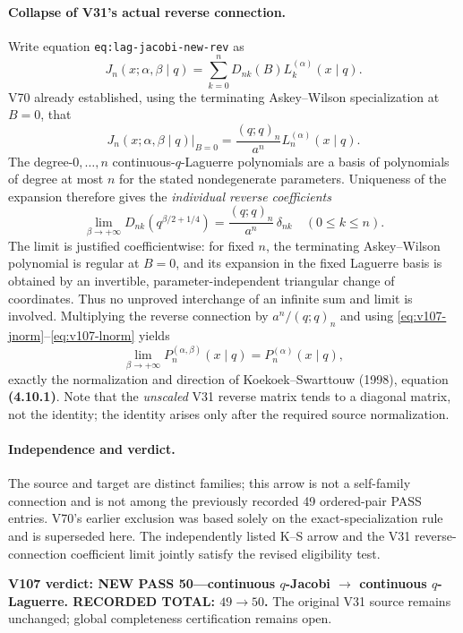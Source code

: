 \documentclass[11pt]{article}
\begin{document}
\paragraph{Collapse of V31's actual reverse connection.}
Write equation \texttt{eq:lag-jacobi-new-rev} as
\[
 J_n(x;\alpha,\beta\mid q)=\sum_{k=0}^n D_{nk}(B) L_k^{(\alpha)}(x\mid q).
\]
V70 already established, using the terminating Askey--Wilson specialization at $B=0$, that
\[
 J_n(x;\alpha,\beta\mid q)\big|_{B=0}=\frac{(q;q)_n}{a^n}L_n^{(\alpha)}(x\mid q).
\]
The degree-$0,\ldots,n$ continuous-$q$-Laguerre polynomials are a basis of polynomials of degree at most $n$ for the stated nondegenerate parameters. Uniqueness of the expansion therefore gives the \emph{individual reverse coefficients}
\begin{equation}\label{eq:v107-delta}
 \boxed{\lim_{\beta\to+\infty}D_{nk}(q^{\beta/2+1/4})=\frac{(q;q)_n}{a^n}\,\delta_{nk}\quad(0\le k\le n).}
\end{equation}
The limit is justified coefficientwise: for fixed $n$, the terminating Askey--Wilson polynomial is regular at $B=0$, and its expansion in the fixed Laguerre basis is obtained by an invertible, parameter-independent triangular change of coordinates. Thus no unproved interchange of an infinite sum and limit is involved. Multiplying the reverse connection by $a^n/(q;q)_n$ and using \eqref{eq:v107-jnorm}--\eqref{eq:v107-lnorm} yields
\begin{equation}\label{eq:v107-limit}
 \boxed{\lim_{\beta\to+\infty}P_n^{(\alpha,\beta)}(x\mid q)=P_n^{(\alpha)}(x\mid q),}
\end{equation}
exactly the normalization and direction of Koekoek--Swarttouw (1998), equation \textbf{(4.10.1)}. Note that the \emph{unscaled} V31 reverse matrix tends to a diagonal matrix, not the identity; the identity arises only after the required source normalization.

\paragraph{Independence and verdict.}
The source and target are distinct families; this arrow is not a self-family connection and is not among the previously recorded 49 ordered-pair PASS entries. V70's earlier exclusion was based solely on the exact-specialization rule and is superseded here. The independently listed K--S arrow and the V31 reverse-connection coefficient limit jointly satisfy the revised eligibility test.

\noindent\textbf{V107 verdict: NEW PASS 50---continuous $q$-Jacobi $\to$ continuous $q$-Laguerre. RECORDED TOTAL: $49\to50$.} The original V31 source remains unchanged; global completeness certification remains open.
\end{document}
